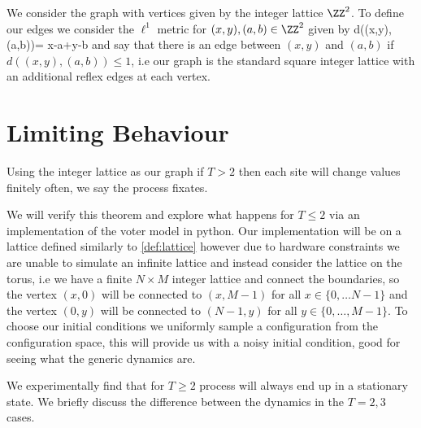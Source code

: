 \begin{defn}\label{def:lattice}
	We consider the graph with vertices given by the integer lattice \(\ZZ^2\).
	To define our edges we consider the \(\ell^1\) metric for \((x,y),(a,b)\in\ZZ^2\) given by
	\be
	d((x,y),(a,b))= \lvert x-a\rvert +\lvert y-b\rvert
	\ee
	and say that there is an edge between \((x,y)\) and \((a,b)\) if \(d((x,y),(a,b))\le  1\),
	i.e our graph is the standard square integer lattice with an additional reflex edges at each vertex.
\end{defn}


\section{Limiting Behaviour}\label{sec:limit}
\begin{thm}\label{thm:convergence}
		Using the integer lattice as our graph if \(T>2\) then each site will change values finitely often, we say the process fixates\cite{ergo}.
\end{thm}

We will verify this theorem and explore what happens for \(T\le 2\) via an implementation of the voter model in python.
Our implementation will be on a lattice defined similarly to \cref{def:lattice} however due to hardware constraints we are unable to simulate an infinite lattice and instead consider the lattice on the torus, i.e we have a finite \(N\times M\) integer lattice and connect the boundaries, so the vertex \((x,0)\) will be connected to \((x,M-1)\) for all \(x\in\{0,\dots  N-1\}\) and the vertex \((0,y)\) will be connected to \((N-1,y)\) for all \(y\in\{0,\dots, M-1\}\).
To choose our initial conditions we uniformly sample a configuration from the configuration space, this will provide us with a noisy initial condition, good for seeing what the generic dynamics are. 

We experimentally find that for \(T\ge 2\) process will always end up in a stationary state.
We briefly discuss the difference between the dynamics in the \(T=2,3\) cases.

